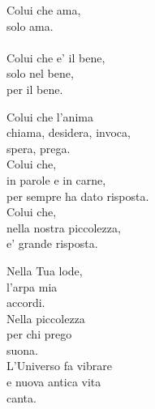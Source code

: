 \begin{haiku}
    Colui che
    ama,\\
    solo ama.\\
    \leavevmode\\
    Colui che e' il bene,\\
    solo nel bene,\\
    per il bene.\\
\end{haiku}

\begin{haiku}
    Colui che l'anima\\
    chiama, desidera, invoca,\\
    spera, prega.\\
    Colui che,\\
    in parole e in carne,\\
    per sempre ha dato risposta.\\
    Colui che,\\
    nella nostra piccolezza,\\
    e' grande risposta.\\
\end{haiku}

\begin{haiku}
    Nella Tua lode,\\
    l'arpa mia\\
    accordi.\\
    Nella piccolezza\\
    per chi prego\\
    suona.\\
    L'Universo fa vibrare\\
    e nuova antica vita\\
    canta.\\
\end{haiku}

